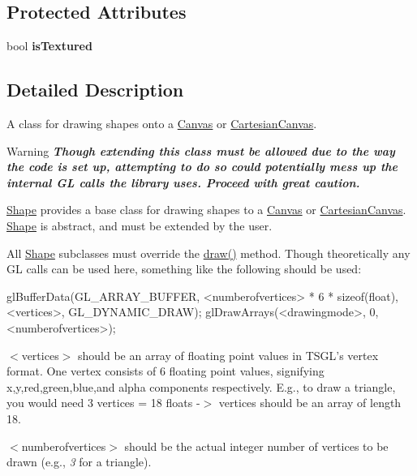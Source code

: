 \subsection*{Protected Attributes}
\begin{DoxyCompactItemize}
\item 
\hypertarget{class_shape_ad21644e3f39633feb48ad5b822301495}{bool {\bfseries is\+Textured}}\label{class_shape_ad21644e3f39633feb48ad5b822301495}

\end{DoxyCompactItemize}


\subsection{Detailed Description}
A class for drawing shapes onto a \hyperlink{class_canvas}{Canvas} or \hyperlink{class_cartesian_canvas}{Cartesian\+Canvas}. 

\begin{DoxyWarning}{Warning}
{\bfseries {\itshape Though extending this class must be allowed due to the way the code is set up, attempting to do so could potentially mess up the internal G\+L calls the library uses. Proceed with great caution.}}
\end{DoxyWarning}
\hyperlink{class_shape}{Shape} provides a base class for drawing shapes to a \hyperlink{class_canvas}{Canvas} or \hyperlink{class_cartesian_canvas}{Cartesian\+Canvas}. \hyperlink{class_shape}{Shape} is abstract, and must be extended by the user.

All \hyperlink{class_shape}{Shape} subclasses must override the \hyperlink{class_shape_afacc5aad8e37308c3ce8fef768199b05}{draw()} method. Though theoretically any G\+L calls can be used here, something like the following should be used\+: 
\begin{DoxyCode}
glBufferData(GL\_ARRAY\_BUFFER, <numberofvertices> * 6 * \textcolor{keyword}{sizeof}(\textcolor{keywordtype}{float}), <vertices>, GL\_DYNAMIC\_DRAW);
glDrawArrays(<drawingmode>, 0, <numberofvertices>);
\end{DoxyCode}


$<$vertices$>$ should be an array of floating point values in T\+S\+G\+L's vertex format. One vertex consists of 6 floating point values, signifying x,y,red,green,blue,and alpha components respectively. E.\+g., to draw a triangle, you would need 3 vertices = 18 floats -\/$>$ vertices should be an array of length 18.

$<$numberofvertices$>$ should be the actual integer number of vertices to be drawn (e.\+g., {\itshape 3} for a triangle).

